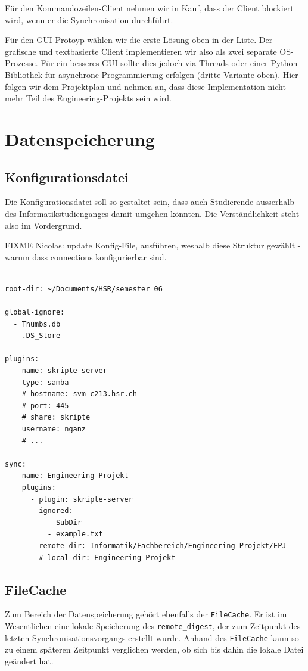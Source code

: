 \documentclass[a4paper]{article}
\let\oldsection\section
\renewcommand\section{\clearpage\oldsection}
\begin{document}
Für den Kommandozeilen-Client nehmen wir in Kauf, dass der Client blockiert wird, wenn er die Synchronisation durchführt.

Für den GUI-Protoyp wählen wir die erste Lösung oben in der Liste. Der grafische und textbasierte Client implementieren wir also als zwei separate OS-Prozesse. Für ein besseres GUI sollte dies jedoch via Threads oder einer Python-Bibliothek für asynchrone Programmierung erfolgen (dritte Variante oben). Hier folgen wir dem Projektplan und nehmen an, dass diese Implementation nicht mehr Teil des Engineering-Projekts sein wird.

\section{Datenspeicherung}

\subsection{Konfigurationsdatei}
Die Konfigurationsdatei soll so gestaltet sein, dass auch Studierende ausserhalb des Informatikstudienganges damit umgehen könnten. Die Verständlichkeit steht also im Vordergrund. 

FIXME Nicolas: update Konfig-File, ausführen, weshalb diese Struktur gewählt - warum dass connections konfigurierbar sind.

\begin{verbatim}

root-dir: ~/Documents/HSR/semester_06

global-ignore:
  - Thumbs.db
  - .DS_Store

plugins:
  - name: skripte-server
    type: samba
    # hostname: svm-c213.hsr.ch
    # port: 445
    # share: skripte
    username: nganz
    # ...

sync:
  - name: Engineering-Projekt
    plugins:
      - plugin: skripte-server
        ignored:
          - SubDir
          - example.txt
        remote-dir: Informatik/Fachbereich/Engineering-Projekt/EPJ
        # local-dir: Engineering-Projekt
\end{verbatim}

\subsection{FileCache}

Zum Bereich der Datenspeicherung gehört ebenfalls der \verb|FileCache|. Er ist im Wesentlichen eine lokale Speicherung des \verb|remote_digest|, der zum Zeitpunkt des letzten Synchronisationsvorgangs erstellt wurde. Anhand des \verb|FileCache| kann so zu einem späteren Zeitpunkt verglichen werden, ob sich bis dahin die lokale Datei geändert hat.
\end{document}
